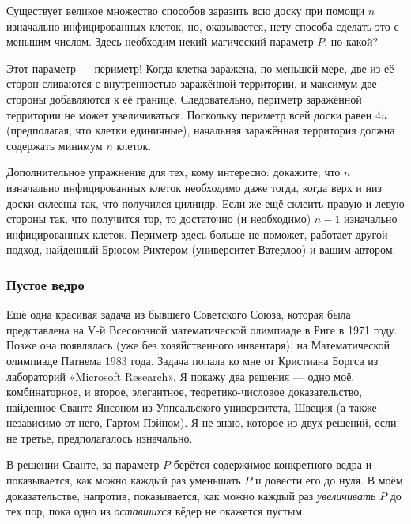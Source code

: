 Существует великое множество способов заразить всю доску при помощи $n$ изначально инфицированных клеток, но, оказывается, нету способа сделать это с меньшим числом.
Здесь необходим некий магический параметр $P$, но какой?

Этот параметр --- периметр!
Когда клетка заражена, по меньшей мере, две из её сторон сливаются с внутренностью заражённой территории, и максимум две стороны добавляются к её границе.
Следовательно, периметр заражённой территории не может увеличиваться.
Поскольку периметр всей доски равен $4n$ (предполагая, что клетки единичные), начальная заражённая территория должна содержать минимум $n$ клеток.
\heart

Дополнительное упражнение для тех, кому интересно: докажите, что $n$ изначально инфицированных клеток необходимо даже тогда, когда верх и низ доски склеены так, что получился цилиндр.
Если же ещё склеить правую и левую стороны так, что получится тор, то достаточно (и необходимо) $n-1$ изначально инфицированных клеток.
Периметр здесь больше не поможет,
работает другой подход, найденный Брюсом Рихтером (университет Ватерлоо) %
и вашим автором.

\subsubsection*{Пустое ведро}%

Ещё одна красивая задача из бывшего Советского Союза, которая была представлена на V-й Всесоюзной математической олимпиаде в Риге в 1971 году.
Позже она появлялась (уже без хозяйственного инвентаря), на Математической олимпиаде Патнема 1983 года.
Задача попала ко мне от Кристиана Боргса из лабораторий «Microsoft Research». %
Я покажу два решения --- одно моё, комбинаторное, и второе, элегантное, теоретико-числовое доказательство, найденное Сванте Янсоном из Уппсальского университета, Швеция %
(а также независимо от него, Гартом Пэйном). %
Я не знаю, которое из двух решений, если не третье, предполагалось изначально.

\medskip

В решении Сванте, за параметр $P$ берётся содержимое конкретного ведра и показывается, как можно каждый раз уменьшать $P$ и довести его до нуля.
В моём доказательстве, напротив, показывается, как можно каждый раз \emph{увеличивать} $P$ до тех пор, пока одно из \emph{оставшихся} вёдер не окажется пустым.

